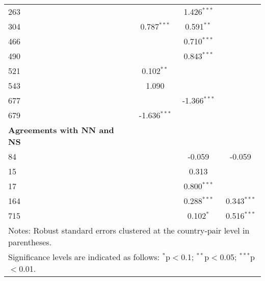 \begin{table}[htbp]
\begin{adjustbox}{max width=\textwidth}
\begin{tabular}{lccc}
    263 &  & 1.426$^{\ast\ast\ast}$ &  \\
    304 & 0.787$^{\ast\ast\ast}$ & 0.591$^{\ast\ast}$ &  \\
    466 &  & 0.710$^{\ast\ast\ast}$ &  \\
    490 &  & 0.843$^{\ast\ast\ast}$ &  \\
    521 & 0.102$^{\ast\ast}$ &  &  \\
    543 & 1.090 &  &  \\
    677 &  & -1.366$^{\ast\ast\ast}$ &  \\
    679 & -1.636$^{\ast\ast\ast}$ &  &  \\
    \hline
    \textbf{Agreements with NN and NS} &  &  &  \\
    \hline
    84  &  & -0.059 & -0.059 \\
    15  &  & 0.313 &  \\
    17  &  & 0.800$^{\ast\ast\ast}$ &  \\
    164 &  & 0.288$^{\ast\ast\ast}$ & 0.343$^{\ast\ast\ast}$ \\
    715 &  & 0.102$^{\ast}$ & 0.516$^{\ast\ast\ast}$ \\
    \hline
    \multicolumn{4}{l}{\footnotesize{Notes: Robust standard errors clustered at the country-pair level in parentheses.}} \\
    \multicolumn{4}{l}{\footnotesize{Significance levels are indicated as follows: $^{\ast}$p$<$0.1; $^{\ast\ast}$p$<$0.05; $^{\ast\ast\ast}$p$<$0.01.}} \\
    \end{tabular}
    \end{adjustbox}
\end{table}